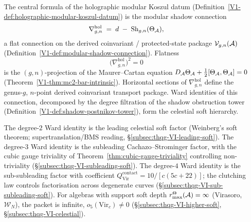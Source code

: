 %
%
%
%
%

The central formula of the holographic modular Koszul datum
(Definition~\ref{V1-def:holographic-modular-koszul-datum}) is the modular
shadow connection
\begin{equation}%
\nabla^{\mathrm{hol}}_{g,n}
\;=\;
d \;-\; \Sh_{g,n}(\Theta_\cA),
\end{equation}
a flat connection on the derived coinvariant / protected-state package
$\mathcal{V}_{g,n}(\mathcal{A})$
(Definition~\ref{V1-def:modular-shadow-connection}).
Flatness
\begin{equation}%
\bigl(\nabla^{\mathrm{hol}}_{g,n}\bigr)^2 = 0
\end{equation}
is the $(g,n)$-projection of the Maurer--Cartan equation
$D_{\mathcal{A}}\Theta_{\mathcal{A}} + \tfrac{1}{2}[\Theta_{\mathcal{A}},\Theta_{\mathcal{A}}] = 0$
(Theorem~\ref*{V1-thm:mc2-bar-intrinsic}). Horizontal sections
of $\nabla^{\mathrm{hol}}_{g,n}$ define the genus-$g$,
$n$-point derived coinvariant transport package. Ward
identities of this connection, decomposed by the degree filtration
of the shadow obstruction tower
(Definition~\ref{V1-def:shadow-postnikov-tower}), form the
celestial soft hierarchy.

The degree-$2$ Ward identity is the leading celestial soft factor
(Weinberg's soft theorem; supertranslation/BMS reading,
\S\ref{subsec:thqg-VI-leading-soft}). The degree-$3$ Ward identity
is the subleading Cachazo--Strominger factor, with the cubic gauge
triviality of Theorem~\ref{thm:cubic-gauge-triviality} controlling
non-triviality (\S\ref{subsec:thqg-VI-subleading-soft}). The
degree-$4$ Ward identity is the sub-subleading factor with
coefficient $Q^{\mathrm{contact}}_{\mathrm{Vir}} = 10/[c(5c+22)]$;
the clutching law controls factorisation across degenerate curves
(\S\ref{subsec:thqg-VI-sub-subleading-soft}). For algebras with
support soft depth \(r^\Theta_{\max}(\mathcal{A})=\infty\) (Virasoro,
\(\mathcal{W}_N\)), the packet
is infinite, $o_5(\mathrm{Vir}_c) \neq 0$
(\S\ref{subsec:thqg-VI-higher-soft},
\S\ref{subsec:thqg-VI-celestial}).

